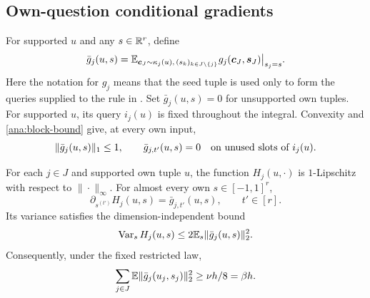 \subsection{Own-question conditional gradients}

For supported \(u\) and any \(s\in\mathbb R^r\), define
\begin{equation}
 \bar g_j(u,s)=
   \mathbb E_{\boldsymbol c_J\sim\kappa_j(u),\,(s_k)_{k\in J\setminus\{j\}}}
               g_j(\boldsymbol c_J,\boldsymbol s_J)\big|_{s_j=s}.
 \label{ana:conditional-gradient}
\end{equation}
Here the notation for \(g_j\) means that the seed tuple is used
only to form the queries supplied to the rule in
. Set \(\bar g_j(u,s)=0\) for unsupported
own tuples. For supported \(u\), its query \(i_j(u)\) is fixed
throughout the integral. Convexity and \eqref{ana:block-bound} give,
at every own input,
\begin{equation}
 \|\bar g_j(u,s)\|_1\leq1,
 \qquad
 \bar g_{j,t'}(u,s)=0\quad\hbox{on unused slots of }i_j(u).
 \label{ana:mean-block-bound}
\end{equation}

\begin{lemma}
\label{ana:cube}
For each \(j\in J\) and supported own tuple \(u\), the function
\(H_j(u,\cdot)\) is \(1\)-Lipschitz with respect to
\(\|\cdot\|_\infty\). For almost every own
\(s\in[-1,1]^r\),
\begin{equation}
 \partial_{s^{(t')}}H_j(u,s)=\bar g_{j,t'}(u,s),
 \qquad t'\in[r].
 \label{ana:conditional-derivative}
\end{equation}
Its variance satisfies the dimension-independent bound
\begin{equation}
 \operatorname{Var}_s H_j(u,s)
       \leq2\mathbb E_s\|\bar g_j(u,s)\|_2^2.
 \label{ana:cube-variance}
\end{equation}
Consequently, under the fixed restricted law,
\begin{equation}
 \sum_{j\in J}\mathbb E\|\bar g_j(u_j,s_j)\|_2^2
      \geq\nu h/8=\beta h.
 \label{ana:energy}
\end{equation}
\end{lemma}

